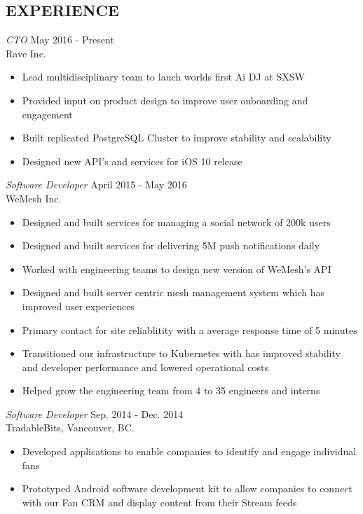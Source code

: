 \documentclass[margin]{res}
\begin{document}
\begin{resume}
\section{EXPERIENCE}

{\sl CTO} \hfill May 2016 - Present \\
Rave Inc.
\begin{itemize}  \itemsep -2pt %
  \item Lead multidisciplinary team to lauch worlds first Ai DJ at SXSW
  \item Provided input on product design to improve user onboarding and engagement
  \item Built replicated PostgreSQL Cluster to improve stability and scalability
  \item Designed new API's and services for iOS 10 release
\end{itemize}

{\sl Software Developer} \hfill April 2015 - May 2016 \\
WeMesh Inc.
\begin{itemize}  \itemsep -2pt %
\item Designed and built services for managing a social network of 200k users
\item Designed and built services for delivering 5M push notifications daily
\item Worked with engineering teams to design new version of WeMesh's API
\item Designed and built server centric mesh management system which has improved user experiences
\item Primary contact for site reliablitity with a average response time of 5 minutes
\item Transitioned our infrastructure to Kubernetes with has improved stability and developer performance and lowered operational costs
\item Helped grow the engineering team from 4 to 35 engineers and interns

\end{itemize}

{\sl Software Developer} \hfill Sep. 2014 - Dec. 2014 \\
TradableBits, Vancouver, BC.
\begin{itemize}  \itemsep -2pt %
      \item Developed applications to enable companies to identify and engage  individual fans
      \item Prototyped Android software development kit to allow companies to connect with our Fan CRM and display content from their Stream feeds
\end{itemize}



\end{resume}
\end{document}
